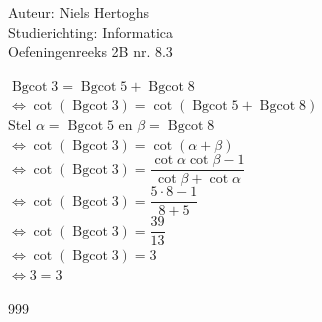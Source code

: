 \documentclass[a4paper]{article}
\newcommand{\Bgcot}{\operatorname{Bgcot}}
\begin{document}
  
\noindent \large Auteur: Niels Hertoghs \\
\noindent \large Studierichting: Informatica\\
\noindent \large Oefeningenreeks 2B nr. 8.3\\

\medskip

\normalsize

$\Bgcot 3 = \Bgcot 5 + \Bgcot 8$\\

$\Leftrightarrow \cot(\Bgcot 3) = \cot(\Bgcot 5 + \Bgcot 8)$\\

Stel $ \alpha = \Bgcot 5 $ en $\beta = \Bgcot 8$\\

$\Leftrightarrow \cot(\Bgcot 3) = \cot(\alpha + \beta)$\\

$\Leftrightarrow \cot(\Bgcot 3) = \dfrac{\cot\alpha \cot\beta -1}{\cot\beta + \cot\alpha}$\\

$\Leftrightarrow \cot(\Bgcot 3) = \dfrac{5 \cdot 8 -1}{8 + 5}$\\

$\Leftrightarrow \cot(\Bgcot 3) = \dfrac{39}{13}$\\

$\Leftrightarrow \cot(\Bgcot 3) = 3$\\

$\Leftrightarrow 3 = 3$\\

\begin{thebibliography}{999}
\end{thebibliography}
\end{document}
